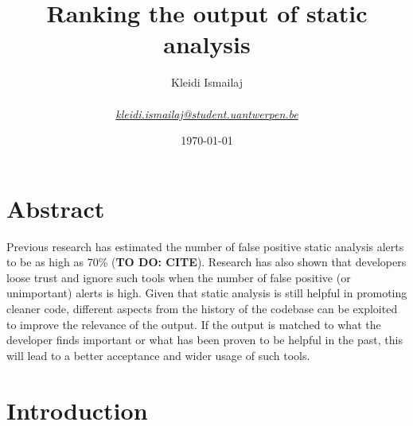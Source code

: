 \documentclass{article}
\title{Ranking the output of static analysis}
\author{Kleidi Ismailaj \\ \\ \href{mailto:kleidi.ismailaj@student.uantwerpen.be}
{\textit{kleidi.ismailaj@student.uantwerpen.be}}}
\date{\today}
\begin{document}
\maketitle
\newpage
\tableofcontents
\newpage

\section*{Abstract}

Previous research has estimated the number of false positive static analysis alerts to be as high as 70\% (\textbf{TO DO: CITE}). Research has also shown that developers loose trust and ignore such tools when the number of false positive (or unimportant) alerts is high. Given that static analysis is still helpful in promoting cleaner code, different aspects from the history of the codebase can be exploited to improve the relevance of the output. If the output is matched to what the developer finds important or what has been proven to be helpful in the past, this will lead to a better acceptance and wider usage of such tools.



\section{Introduction}

\end{document}
